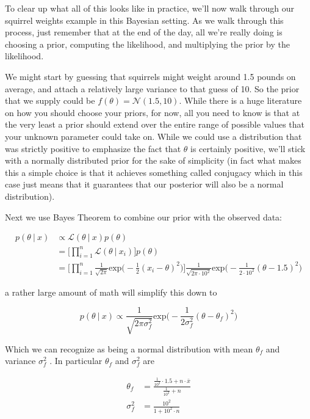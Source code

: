 \documentclass[12pt,twoside]{reedthesis}
\begin{document}
To clear up what all of this looks like in practice, we'll now walk through our squirrel weights example in this Bayesian setting. As we walk through this process, just remember that at the end of the day, all we're really doing is choosing a prior, computing the likelihood, and multiplying the prior by the likelihood.

We might start by guessing that squirrels might weight around 1.5 pounds on average, and attach a relatively large variance to that guess of 10. So the prior that we supply could be \(f(\theta) = \mathcal{N}(1.5,10)\). While there is a huge literature on how you should choose your priors, for now, all you need to know is that at the very least a prior should extend over the entire range of possible values that your unknown parameter could take on. While we could use a distribution that was strictly positive to emphasize the fact that \(\theta\) is certainly positive, we'll stick with a normally distributed prior for the sake of simplicity (in fact what makes this a simple choice is that it achieves something called conjugacy which in this case just means that it guarantees that our posterior will also be a normal distribution).

Next we use Bayes Theorem to combine our prior with the observed data:

\[
\begin{aligned}
p(\theta \ | \ x) &\propto \mathcal{L}(\theta \ | \ x)p(\theta) \\
&= \bigg[\prod_{i=1}^n\mathcal{L}(\theta \ | \ x_i)\bigg]p(\theta) \\
&= \bigg[\prod_{i=1}^n\frac{1}{\sqrt{2\pi}}\text{exp}\bigg(-\frac{1}{2}(x_i - \theta )^2\bigg)\bigg]\frac{1}{\sqrt{2\pi\cdot10^2}}\text{exp}\bigg(-\frac{1}{2\cdot10^2}(\theta - 1.5)^2\bigg) 
\end{aligned}
\]

a rather large amount of math will simplify this down to

\[
p(\theta \ | \ x) \propto \frac{1}{\sqrt{2\pi\sigma_f^2}}\text{exp}\bigg(-\frac{1}{2\sigma_f^2}(\theta - \theta_f)^2\bigg)
\]

Which we can recognize as being a normal distribution with mean \(\theta_f\) and variance \(\sigma^2_f\) . In particular \(\theta_f\) and \(\sigma^2_f\) are

\[
\begin{aligned}
\theta_f &= \frac{\frac{1}{10^2}\cdot1.5 + n\cdot \bar{x}}{\frac{1}{10^2} + n} \\
\sigma^2_f &= \frac{10^2}{1 + 10^2\cdot n}
\end{aligned}
\]
\end{document}
